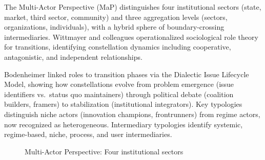 \documentclass[11pt,a4paper]{article}
\begin{document}
The Multi-Actor Perspective (MaP) distinguishes four institutional sectors (state, market, third sector, community) and three aggregation levels (sectors, organizations, individuals), with a hybrid sphere of boundary-crossing intermediaries. Wittmayer and colleagues operationalized sociological role theory for transitions, identifying constellation dynamics including cooperative, antagonistic, and independent relationships.

Bodenheimer linked roles to transition phases via the Dialectic Issue Lifecycle Model, showing how constellations evolve from problem emergence (issue identifiers vs.\ status quo maintainers) through political debate (coalition builders, framers) to stabilization (institutional integrators). Key typologies distinguish niche actors (innovation champions, frontrunners) from regime actors, now recognized as heterogeneous. Intermediary typologies identify systemic, regime-based, niche, process, and user intermediaries.

\begin{figure}[htbp]
\centering
{}
\caption{Multi-Actor Perspective: Four institutional sectors}
\label{fig:map-sectors}
\end{figure}

\end{document}
